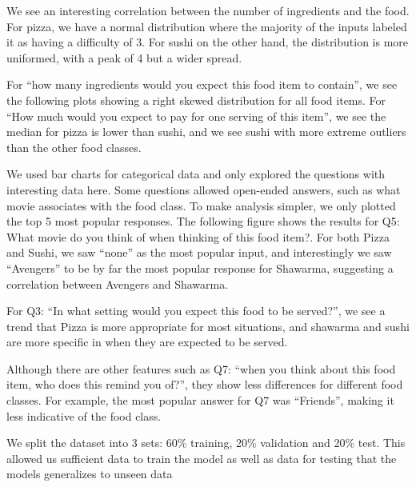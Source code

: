 We see an interesting correlation between the number of ingredients and the food. For pizza, we have a normal distribution where the majority of the inputs labeled it as having a difficulty of 3. For sushi on the other hand, the distribution is more uniformed, with a peak of 4 but a wider spread.

For “how many ingredients would you expect this food item to contain”, we see the following plots showing a right skewed distribution for all food items.
For “How much would you expect to pay for one serving of this item”, we see the median for pizza is lower than sushi, and we see sushi with more extreme outliers than the other food classes.

We used bar charts for categorical data and only explored the questions with interesting data here. Some questions allowed open-ended answers, such as what movie associates with the food class. To make analysis simpler, we only plotted the top 5 most popular responses.
The following figure shows the results for Q5: What movie do you think of when thinking of this food item?. For both Pizza and Sushi, we saw “none” as the most popular input, and interestingly we saw “Avengers” to be by far the most popular response for Shawarma, suggesting a correlation between Avengers and Shawarma.




For Q3: “In what setting would you expect this food to be served?”, we see a trend that Pizza is more appropriate for most situations, and shawarma and sushi are more specific in when they are expected to be served.


Although there are other features such as Q7: “when you think about this food item, who does this remind you of?”, they show less differences for different food classes. For example, the most popular answer for Q7 was “Friends”, making it less indicative of the food class.

We split the dataset into 3 sets: 60\% training, 20\% validation and 20\% test. This allowed us sufficient data to train the model as well as data for testing that the models generalizes to unseen data



